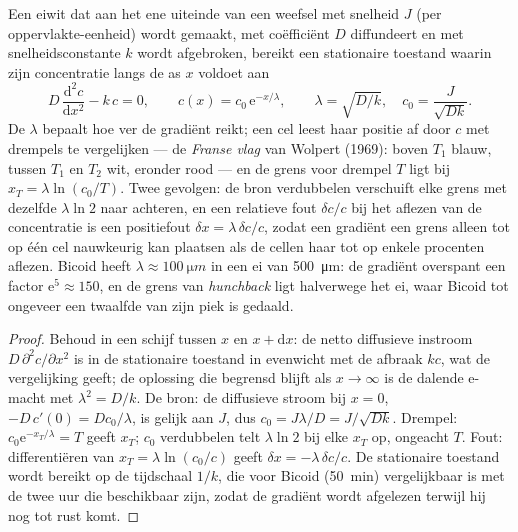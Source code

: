 \begin{theorem}\label{thm:b3:developmental-genetics:gradient}
Een eiwit dat aan het ene uiteinde van een weefsel met snelheid $J$
(per oppervlakte-eenheid) wordt gemaakt, met coëfficiënt $D$
diffundeert en met snelheidsconstante $k$ wordt afgebroken, bereikt een
stationaire toestand waarin zijn concentratie langs de as $x$ voldoet
aan
\[
D\,\frac{\mathrm{d}^{2}c}{\mathrm{d}x^{2}} - k\,c = 0,
\qquad c(x) = c_{0}\,\mathrm{e}^{-x/\lambda}, \qquad \lambda = \sqrt{D/k},
\quad c_{0} = \frac{J}{\sqrt{Dk}} .
\]
De \emph{} $\lambda$ bepaalt hoe ver de gradiënt reikt; een
cel leest haar positie af door $c$ met drempels te vergelijken --- de
\emph{Franse vlag} van Wolpert (1969): boven $T_{1}$ blauw, tussen
$T_{1}$ en $T_{2}$ wit, eronder rood --- en de grens voor drempel
$T$ ligt bij $x_{T} = \lambda\ln(c_{0}/T)$. Twee gevolgen: de bron
verdubbelen verschuift elke grens met dezelfde $\lambda\ln 2$ naar
achteren, en een relatieve fout $\delta c/c$ bij het aflezen van de
concentratie is een positiefout $\delta x = \lambda\,\delta c/c$, zodat
een gradiënt een grens alleen tot op één cel nauwkeurig kan plaatsen
als de cellen haar tot op enkele procenten aflezen. Bicoid heeft
$\lambda \approx \qty{100}{\micro m}$ in een ei van
\qty{500}{\micro m}: de gradiënt overspant een factor $\mathrm{e}^{5}
\approx 150$, en de grens van \emph{hunchback} ligt halverwege het ei,
waar Bicoid tot ongeveer een twaalfde van zijn piek is gedaald.
\end{theorem}
\begin{proof}
Behoud in een schijf tussen $x$ en $x + \mathrm{d}x$: de netto
diffusieve instroom $D\,\partial^{2}c/\partial x^{2}$ is in de
stationaire toestand in evenwicht met de afbraak $kc$, wat de
vergelijking geeft; de oplossing die begrensd blijft als
$x \to \infty$ is de dalende e-macht met
$\lambda^{2} = D/k$. De bron: de diffusieve stroom bij $x = 0$, $-D\,
c'(0) = Dc_{0}/\lambda$, is gelijk aan $J$, dus $c_{0} = J\lambda/D =
J/\sqrt{Dk}$. Drempel: $c_{0}\mathrm{e}^{-x_{T}/\lambda} = T$ geeft
$x_{T}$; $c_{0}$ verdubbelen telt $\lambda\ln 2$ bij elke $x_{T}$ op,
ongeacht $T$. Fout: differentiëren van $x_{T} = \lambda\ln(c_{0}/c)$
geeft $\delta x = -\lambda\,\delta c/c$. De stationaire toestand wordt
bereikt op de tijdschaal $1/k$, die voor Bicoid (\qty{50}{min})
vergelijkbaar is met de twee uur die beschikbaar zijn, zodat de
gradiënt wordt afgelezen terwijl hij nog tot rust komt.
\end{proof}

